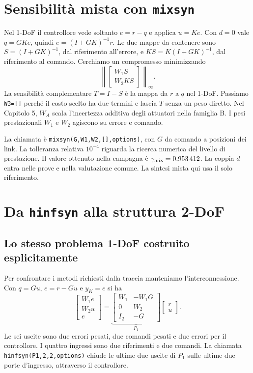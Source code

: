 \section{Sensibilità mista con \texttt{mixsyn}}
\label{sec:mixsyn}

Nel 1-DoF il controllore vede soltanto $e=r-q$ e applica $u=Ke$.
Con $d=0$ vale $q=GKe$, quindi $e=(I+GK)^{-1}r$. Le due
mappe da contenere sono $S=(I+GK)^{-1}$, dal riferimento all'errore,
e $KS=K(I+GK)^{-1}$, dal riferimento al comando. Cerchiamo un
compromesso minimizzando
\[
 \left\|\begin{bmatrix}W_1S\\W_2KS\end{bmatrix}\right\|_\infty.
\]
La sensibilità complementare $T=I-S$ è la mappa da $r$ a $q$
nel 1-DoF. Passiamo \texttt{W3=[]} perché il costo scelto ha due
termini e lascia $T$ senza un peso diretto. Nel Capitolo 5, $W_A$
scala l'incertezza additiva degli attuatori nella famiglia B.
I pesi prestazionali $W_1$ e $W_2$ agiscono su errore e comando.

La chiamata è \texttt{mixsyn(G,W1,W2,[],options)}, con $G$ da
comando a posizioni dei link. La tolleranza relativa $10^{-4}$
riguarda la ricerca numerica del livello di prestazione.
Il valore ottenuto nella campagna è $\gamma_{\rm mix}=\num{0.953412}$.
La coppia $d$ entra nelle prove e nella valutazione comune.
La sintesi mista qui usa il solo riferimento.

\section{Da \texttt{hinfsyn} alla struttura 2-DoF}

\subsection{Lo stesso problema 1-DoF costruito esplicitamente}

Per confrontare i metodi richiesti dalla traccia manteniamo
l'interconnessione. Con $q=Gu$, $e=r-Gu$ e $y_K=e$ si ha
\[
 \begin{bmatrix}W_1e\\W_2u\\e\end{bmatrix}
 =\underbrace{\begin{bmatrix}W_1&-W_1G\\0&W_2\\I_2&-G\end{bmatrix}}_{P_1}
 \begin{bmatrix}r\\u\end{bmatrix}.
\]
Le sei uscite sono due errori pesati, due comandi pesati e due
errori per il controllore. I quattro ingressi sono due riferimenti
e due comandi. La chiamata \texttt{hinfsyn(P1,2,2,options)} chiude
le ultime due uscite di $P_1$ sulle ultime due porte d'ingresso,
attraverso il controllore.

